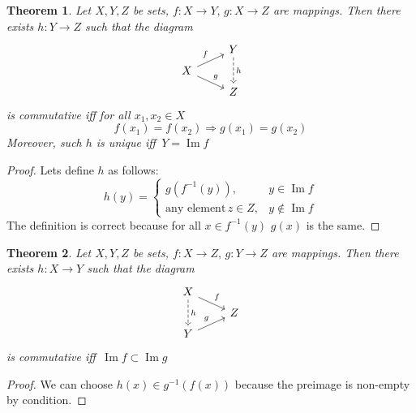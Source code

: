 \documentclass[a4paper, 12pt]{article}
\newtheorem{thm}{Theorem}
\DeclareMathOperator{\Image}{Im}
\begin{document}
\begin{thm}\label{RelImages}
    Let $X, Y, Z$ be sets, $f:X\to Y,\,g:X\to Z$ are mappings. Then there exists $h: Y\to Z$ 
    such that the diagram
    \[
    \begin{tikzcd}[row sep = tiny]
                                          & Y \arrow[dd, dashrightarrow, "h"] \\
         X\arrow[ru, "f"] \arrow[rd, "g"] & \\
                                          & Z 
    \end{tikzcd}
    \]   
    is commutative iff for all $x_1, x_2\in X$
    \[
        f(x_1)=f(x_2) \Rightarrow g(x_1)=g(x_2) 
    \]
    Moreover, such $h$ is unique iff\, $Y=\Image f$ 
\end{thm}
\begin{proof}
    Lets define $h$ as follows:
    \[
        h(y) = 
        \begin{cases}
            g(f^{-1}(y)), & y\in \Image f\\
            \text{any element}\, z\in Z, & y\notin \Image f 
        \end{cases}
    \]
    The definition is correct because for all $x\in f^{-1}(y)$ $g(x)$ is the same.
\end{proof}

\begin{thm}
    Let $X, Y, Z$ be sets, $f:X\to Z,\,g:Y\to Z$ are mappings. 
    Then there exists $h: X\to Y$ such that the diagram
    \[
    \begin{tikzcd}[row sep = tiny]
        X\arrow[dd, dashrightarrow, "h"] \arrow[rd, "f"] &  \\
                                                         &  Z\\
        Y\arrow[ru, "g"] & 
    \end{tikzcd}
    \]   
    is commutative iff\, $\Image f \subset  \Image g$
\end{thm}
\begin{proof}
    We can choose $h(x) \in g^{-1}(f(x))$ because 
    the preimage is non-empty by condition.
\end{proof}
\end{document}

